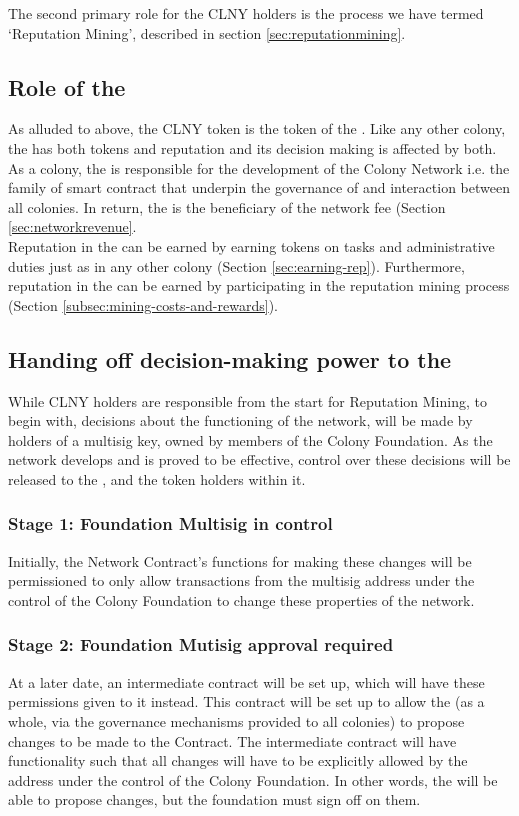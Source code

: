 The second primary role for the CLNY holders is the process we have termed `Reputation Mining', described in section \ref{sec:reputationmining}.

\subsection{Role of the \rc}
As alluded to above, the CLNY token is the token of the \rc. Like any other colony, the \rc has both tokens and reputation and its decision making is affected by both.\\
As a colony, the \rc is responsible for the development of the Colony Network i.e. the family of smart contract that underpin the governance of and interaction between all colonies. In return, the \rc is the beneficiary of the network fee (Section \ref{sec:networkrevenue}.\\
Reputation in the \rc can be earned by earning tokens on tasks and administrative duties just as in any other colony (Section \ref{sec:earning-rep}). Furthermore, reputation in the \rc can be earned by participating in the reputation mining process (Section \ref{subsec:mining-costs-and-rewards}).

\subsection{Handing off decision-making power to the \rc}\label{subsec:ceding-control-to-rc}
While CLNY holders are responsible from the start for Reputation Mining, to begin with, decisions about the functioning of the network, will be made by holders of a multisig key, owned by members of the Colony Foundation. As the network develops and is proved to be effective, control over these decisions will be released to the \rc, and the token holders within it.

\subsubsection*{Stage 1: Foundation Multisig in control}
Initially, the Network Contract's functions for making these changes will be permissioned to only allow transactions from the multisig address under the control of the Colony Foundation to change these properties of the network. 

\subsubsection*{Stage 2: Foundation Mutisig approval required}
At a later date, an intermediate contract will be set up, which will have these permissions given to it instead. This contract will be set up to allow the \rc (as a whole, via the governance mechanisms provided to all colonies) to propose changes to be made to the \rc Contract. The intermediate contract will have functionality such that all changes will have to be explicitly allowed by the address under the control of the Colony Foundation. In other words, the \rc will be able to propose changes, but the foundation must sign off on them.

